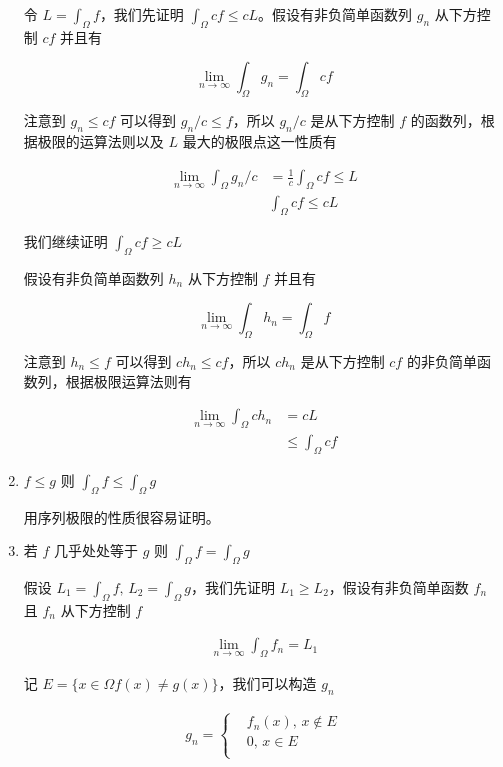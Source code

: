 \begin{enumerate}
    令 $L = \int_{\Omega} f$，我们先证明 $\int_{\Omega} cf \le cL$。假设有非负简单函数列 $g_n$ 从下方控制 $cf$ 并且有

    \[
        \lim_{n \to \infty} \int_{\Omega} g_n = \int_{\Omega} cf
    \]

    注意到 $g_n \le cf$ 可以得到 $g_n /c \le f$，所以 $g_n/c$ 是从下方控制 $f$  的函数列，根据极限的运算法则以及 $L$ 最大的极限点这一性质有

    \begin{align*}
        \lim_{n \to \infty} \int_{\Omega} g_n/ c &= \frac{1}{c}\int_{\Omega} cf \le L \\
        & \int_{\Omega} cf \le cL
    \end{align*}

    我们继续证明 $\int_{\Omega} cf \ge cL$

    假设有非负简单函数列 $h_n$ 从下方控制 $f$ 并且有

    \[
        \lim_{n \to \infty} \int_{\Omega} h_n = \int_{\Omega} f
    \]

    注意到 $h_n \le f$ 可以得到 $ch_n \le cf$，所以 $c h_n$ 是从下方控制 $cf$ 的非负简单函数列，根据极限运算法则有

    \begin{align*}
        \lim_{n \to \infty} \int_{\Omega} ch_n &=  cL \\
        & \le \int_{\Omega} cf
    \end{align*}

    \item $f \le g$ 则 $\int_{\Omega} f \le \int_{\Omega} g$

    用序列极限的性质很容易证明。

    \item 若 $f$ 几乎处处等于 $g$ 则 $\int_{\Omega}f = \int_{\Omega}g $

    假设 $L_1 = \int_{\Omega} f,\, L_2 = \int_{\Omega} g$，我们先证明 $L_1 \ge L_2$，假设有非负简单函数 $f_n$ 且 $f_n$ 从下方控制 $f$

    \begin{align*}
        \lim_{n \to \infty}\int_{\Omega}f_n = L_1
    \end{align*}
    
    记 $E = \{x \in \Omega f(x) \ne g(x)\}$，我们可以构造 $g_n$

    \begin{align*}
        g_n = \begin{cases}
            & f_n(x),\, x \notin E \\
            & 0,\, x \in E \\
        \end{cases} 
    \end{align*}


\end{enumerate}
